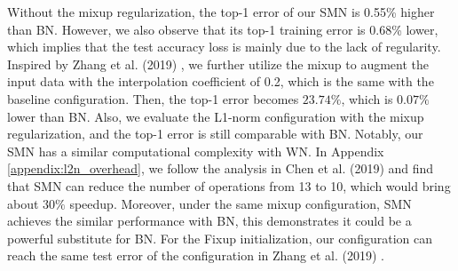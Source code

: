 \documentclass[10pt,journal,compsoc]{IEEEtran}
\newcommand{\modify}[1]{{ #1}}
\begin{document}
\begin{table}[ht]
\vspace{-10pt}
\caption{Test error of methods on ResNet-50 (Cl=$95\%$).}
\centering
{}
\label{tab:Accuracy_res_imagenet}
\end{table}

Without the mixup regularization, the top-1 error of our SMN is 0.55\% higher than BN. However, we also observe that its top-1 training error is 0.68\% lower, which implies that the test accuracy loss is mainly due to the lack of regularity. Inspired by Zhang et al. (2019) \cite{zhang2019fixup}, we further utilize the mixup\cite{zhang2017mixup} to augment the input data with the interpolation coefficient of 0.2, which is the same with the baseline configuration. Then, the top-1 error becomes $23.74\%$, which is $0.07\%$ lower than BN. Also, we evaluate the L1-norm configuration with the mixup regularization, and the top-1 error is still comparable with BN. Notably, our SMN has a similar computational complexity with WN. \modify{In Appendix \ref{appendix:l2n_overhead}, we follow the analysis in Chen et al. (2019) \cite{chen2019effective} and find that SMN can reduce the number of operations from 13 to 10, which would bring about $30\%$ speedup. Moreover, under the same mixup configuration, SMN achieves the similar performance with BN, this demonstrates it could be a powerful substitute for BN.} For the Fixup initialization, our configuration can reach the same test error of the configuration in Zhang et al. (2019) \cite{zhang2019fixup}.
 \label{sec: imagenet_exp}
\end{document}
